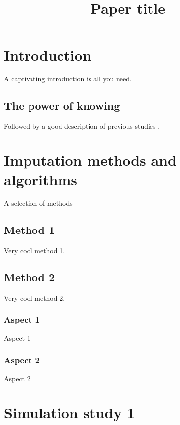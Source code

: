 \documentclass[a4paper,doc,floatsintext,natbib]{apa6}\usepackage[]{graphicx}\usepackage[]{xcolor}
\title{Paper title}
\begin{document}
	\maketitle

    \setcounter{secnumdepth}{3} %

    
\section{Introduction}

    A captivating introduction is all you need.

\subsection{The power of knowing}

    Followed by a good description of previous studies \citep{collinsEtAl:2001}.
    
\section{Imputation methods and algorithms}\label{sec:methods}

	A selection of methods

\subsection{Method 1}

	Very cool method 1.

\subsection{Method 2}

	Very cool method 2.

\subsubsection{Aspect 1}

	Aspect 1

\subsubsection{Aspect 2}

	Aspect 2
    
\section{Simulation study 1}
\end{document}
